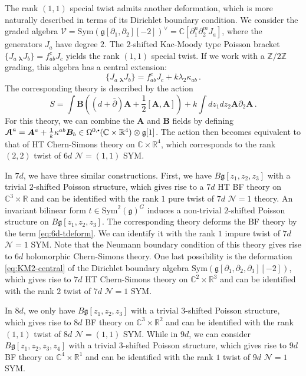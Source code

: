 \documentclass[11pt]{article}
\newcommand{\C}{\mathbb{C}}
\newcommand{\R}{\mathbb{R}}
\newcommand{\Z}{\mathbb{Z}}
\newcommand\sbullet[1][.5]{\mathbin{\vcenter{\hbox{\scalebox{#1}{$\bullet$}}}}}
\numberwithin{equation}{section}
\begin{document}
The rank $(1,1)$ special twist admits another deformation, which is more naturally described in terms of its Dirichlet boundary condition. We consider the graded algebra $\mathcal{V} = \mathrm{Sym}(\mathfrak{g}[\partial_1,\partial_2][-2])^{\vee} = \C[\partial_1^n\partial_2^mJ_a]$, where the generators $J_a$ have degree $2$. The $2$-shifted Kac-Moody type Poisson bracket $\{J_a~_{\boldsymbol{\lambda}}J_b\} = f_{ab}^cJ_c$ yields the rank $(1,1)$ special twist. If we work with a $\Z/2\Z$ grading, this algebra has a central extension:
\begin{equation}\label{eq:KM2-central}
	\{J_a~_{\boldsymbol{\lambda}}J_b\} = f_{ab}^cJ_c + k\lambda_2\kappa_{ab}\,.
\end{equation}
The corresponding theory is described by the action 
\begin{equation}
	S = \int \boldsymbol{B}\left( (d+\bar{\partial})\boldsymbol{A} + \frac{1}{2}[\boldsymbol{A},\boldsymbol{A}]\right) + k\int dz_1dz_2 \boldsymbol{A}\partial_2 \boldsymbol{A}\,.
\end{equation}
For this theory, we can combine the $\boldsymbol{A}$ and $\boldsymbol{B}$ fields by defining $\boldsymbol{\EuScript{A}}^a = \boldsymbol{A}^a + \frac{1}{k}\kappa^{ab}\boldsymbol{B}_b \in \Omega^{0,\sbullet}(\C\times \R^4)\otimes \mathfrak{g}[1]$. The action then becomes equivalent to that of HT Chern-Simons theory on $\C\times \R^4$, which corresponds to the rank $(2,2)$ twist of $6d$ $\mathcal{N} = (1,1)$ SYM.


In $7d$, we have three similar constructions. First, we have $B\mathfrak{g}[z_1,z_2,z_3]$ with a trivial $2$-shifted Poisson structure, which gives rise to a $7d$ HT BF theory on $\C^3\times \R$ and can be identified with the rank $1$ pure twist of $7d$ $\mathcal{N} = 1$ theory. An invariant bilinear form $t \in \mathrm{Sym}^2(\mathfrak{g})^G$ induces a non-trivial $2$-shifted Poisson structure on $B\mathfrak{g}[z_1,z_2,z_3]$. The corresponding theory deforms the BF theory by the term \eqref{eq:6d-tdeform}. We can identify it with the rank $1$ impure twist of $7d$ $\mathcal{N} = 1$ SYM. Note that the Neumann boundary condition of this theory gives rise to $6d$ holomorphic Chern-Simons theory. One last possibility is the deformation \eqref{eq:KM2-central} of the Dirichlet boundary algebra $\mathrm{Sym}(\mathfrak{g}[\partial_1,\partial_2,\partial_3][-2])$, which gives rise to $7d$ HT Chern-Simons theory on $\C^2\times \R^3$ and can be identified with the rank $2$ twist of $7d$ $\mathcal{N} = 1$ SYM.

In $8d$, we only have $B\mathfrak{g}[z_1,z_2,z_3]$ with a trivial $3$-shifted Poisson structure, which gives rise to $8d$ BF theory on $\C^3\times \R^2$ and can be identified with the rank $(1,1)$ twist of $8d$ $\mathcal{N} = (1,1)$ SYM. While in $9d$, we can consider $B\mathfrak{g}[z_1,z_2,z_3,z_4]$ with a trivial $3$-shifted Poisson structure, which gives rise to $9d$ BF theory on $\C^4\times \R^1$ and can be identified with the rank $1$ twist of $9d$ $\mathcal{N} = 1$ SYM. 
\end{document}
